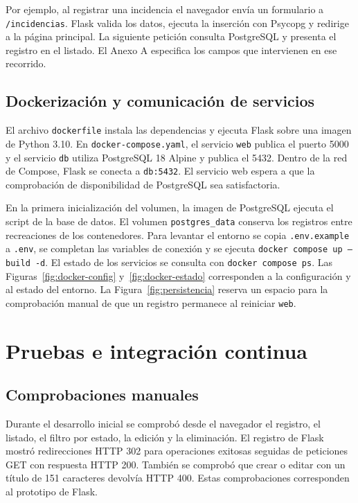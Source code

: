 \documentclass[12pt,letterpaper]{article}
\begin{document}
Por ejemplo, al registrar una incidencia el navegador envía un formulario a \texttt{/incidencias}. Flask valida los datos, ejecuta la inserción con Psycopg y redirige a la página principal. La siguiente petición consulta PostgreSQL y presenta el registro en el listado. El Anexo A especifica los campos que intervienen en ese recorrido.

\subsection{Dockerización y comunicación de servicios}

El archivo \texttt{dockerfile} instala las dependencias y ejecuta Flask sobre una imagen de Python 3.10. En \texttt{docker-compose.yaml}, el servicio \texttt{web} publica el puerto 5000 y el servicio \texttt{db} utiliza PostgreSQL 18 Alpine y publica el 5432. Dentro de la red de Compose, Flask se conecta a \texttt{db:5432}. El servicio web espera a que la comprobación de disponibilidad de PostgreSQL sea satisfactoria.

En la primera inicialización del volumen, la imagen de PostgreSQL ejecuta el script de la base de datos. El volumen \texttt{postgres\_data} conserva los registros entre recreaciones de los contenedores. Para levantar el entorno se copia \texttt{.env.example} a \texttt{.env}, se completan las variables de conexión y se ejecuta \texttt{docker compose up --build -d}. El estado de los servicios se consulta con \texttt{docker compose ps}. Las Figuras~\ref{fig:docker-config} y~\ref{fig:docker-estado} corresponden a la configuración y al estado del entorno. La Figura~\ref{fig:persistencia} reserva un espacio para la comprobación manual de que un registro permanece al reiniciar \texttt{web}.

\section{Pruebas e integración continua}

\subsection{Comprobaciones manuales}

Durante el desarrollo inicial se comprobó desde el navegador el registro, el listado, el filtro por estado, la edición y la eliminación. El registro de Flask mostró redirecciones HTTP 302 para operaciones exitosas seguidas de peticiones GET con respuesta HTTP 200. También se comprobó que crear o editar con un título de 151 caracteres devolvía HTTP 400. Estas comprobaciones corresponden al prototipo de Flask.
\end{document}
